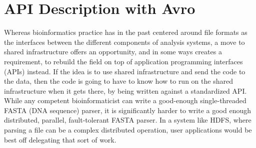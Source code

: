 \documentclass[11pt,proposal]{ucthesis}
\begin{document}



    
    
    
    
    
    
        
    
    

\section{API Description with Avro}

Whereas bioinformatics practice has in the past centered around file formats as the interfaces between the different components of analysis systems, a move to shared infrastructure offers an opportunity, and in some ways creates a requirement, to rebuild the field on top of application programming interfaces (APIs) instead. If the idea is to use shared infrastructure and send the code to the data, then the code is going to have to know how to run on the shared infrastructure when it gets there, by being written against a standardized API. While any competent bioinformaticist can write a good-enough single-threaded FASTA (DNA sequence) parser, it is significantly harder to write a good enough distributed, parallel, fault-tolerant FASTA parser. In a system like HDFS, where parsing a file can be a complex distributed operation, user applications would be best off delegating that sort of work.
\end{document}
